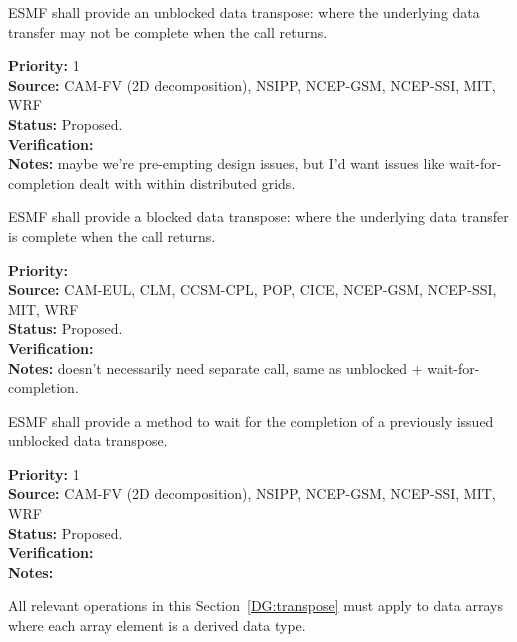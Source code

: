  \label{DG:transpose}


ESMF shall provide an unblocked data transpose: where the underlying
data transfer may not be complete when the call returns.

\begin{reqlist}
{\bf Priority:} 1 \\ 
{\bf Source:} CAM-FV (2D decomposition), NSIPP, NCEP-GSM, NCEP-SSI, MIT, WRF \\
{\bf Status:} Proposed. \\
{\bf Verification:} \\
{\bf Notes:} maybe we're pre-empting design issues, but I'd want
  issues like wait-for-completion dealt with within distributed grids.
\end{reqlist}


ESMF shall provide a blocked data transpose: where the underlying
data transfer is complete when the call returns.

\begin{reqlist}
{\bf Priority:} \\
{\bf Source:} CAM-EUL, CLM, CCSM-CPL, POP, CICE, NCEP-GSM, NCEP-SSI, MIT, WRF \\
{\bf Status:} Proposed. \\
{\bf Verification:} \\
{\bf Notes:} doesn't necessarily need separate call, same as unblocked
  + wait-for-completion.
\end{reqlist}


ESMF shall provide a method to wait for the completion of a previously
issued unblocked data transpose.

\begin{reqlist}
{\bf Priority:} 1 \\ 
{\bf Source:} CAM-FV (2D decomposition), NSIPP, NCEP-GSM, NCEP-SSI, MIT, WRF \\
{\bf Status:} Proposed. \\
{\bf Verification:} \\
{\bf Notes:}
\end{reqlist}


All relevant operations in this Section~\ref{DG:transpose} must apply to
data arrays where each array element is a derived data type.

